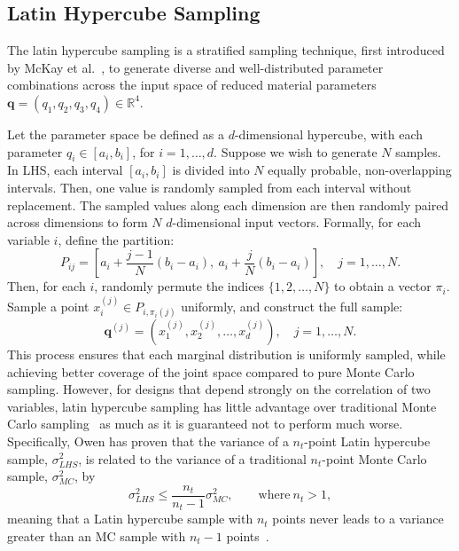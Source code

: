 \documentclass[a4paper,11pt]{article}
\begin{document}
\subsection{Latin Hypercube Sampling}
The latin hypercube sampling is a stratified sampling technique, first introduced by McKay et al.~\cite{McKay}, to generate diverse and well-distributed parameter combinations across the input space of reduced material parameters $\mathbf{q} = (q_1, q_2, q_3, q_4) \in \mathbb{R}^4$.

Let the parameter space be defined as a $d$-dimensional hypercube, with each parameter \( q_i \in [a_i, b_i] \), for \( i = 1, \ldots, d \). Suppose we wish to generate \( N \) samples. In LHS, each interval \([a_i, b_i]\) is divided into \( N \) equally probable, non-overlapping intervals. Then, one value is randomly sampled from each interval without replacement. The sampled values along each dimension are then randomly paired across dimensions to form \( N \) $d$-dimensional input vectors. Formally, for each variable \( i \), define the partition:
\begin{equation}
P_{ij} = \left[ a_i + \frac{j-1}{N}(b_i - a_i),\ a_i + \frac{j}{N}(b_i - a_i) \right], \quad j = 1, \dots, N.
\end{equation}
Then, for each \( i \), randomly permute the indices \( \{1, 2, \dots, N\} \) to obtain a vector \( \pi_i \). Sample a point \( x_i^{(j)} \in P_{i,\pi_i(j)} \) uniformly, and construct the full sample:
\begin{equation}
\mathbf{q}^{(j)} = \left( x_1^{(j)}, x_2^{(j)}, \dots, x_d^{(j)} \right), \quad j = 1, \dots, N.
\end{equation}
This process ensures that each marginal distribution is uniformly sampled, while achieving better coverage of the joint space compared to pure Monte Carlo sampling. However, for designs that depend strongly on the correlation of two variables, latin hypercube sampling has little advantage over traditional Monte Carlo sampling~\cite{press1992} as much as it is guaranteed not to perform much worse. Specifically, Owen has proven that the variance of a $n_t$-point Latin hypercube sample, $\sigma^2_{LHS}$, is related to the variance of a traditional $n_t$-point Monte Carlo sample, $\sigma^2_{MC}$, by
\begin{equation}
	\sigma^2_{LHS} \leq \frac{n_t}{n_t -1}\sigma^2_{MC}, \qquad \text{where}\: n_t > 1,
	\label{eq:vlhs_vmc}  
\end{equation}
meaning that a Latin hypercube sample with $n_t$ points never leads to a variance greater than an MC sample with $n_t-1$ points~\cite{owen1997monte}.
\end{document}
